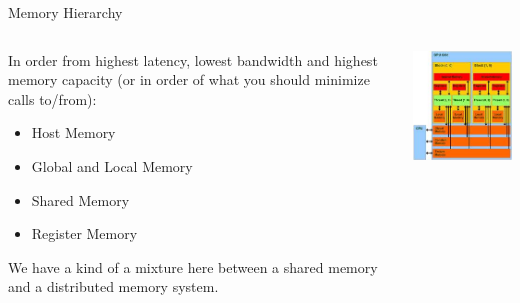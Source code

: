 \documentclass[xcolor=svgnames]{beamer}
\begin{document}
\begin{frame}{Memory Hierarchy}
 \begin{columns}
  \begin{column}{0.5\textwidth}
   In order from highest latency, lowest bandwidth and highest memory capacity (or in order of what you should minimize calls to/from):
   \begin{itemize}
    \item Host Memory
    \item Global and Local Memory
    \item Shared Memory
    \item Register Memory
   \end{itemize}
   
   We have a kind of a mixture here between a shared memory and a distributed memory system.
  \end{column}
  
  \begin{column}{0.5\textwidth}
   \includegraphics[width=\textwidth]
{images/Maths_Project_Presentation_memory_hierarchy.jpg}
  \end{column}
 \end{columns}
\end{frame}
\end{document}
